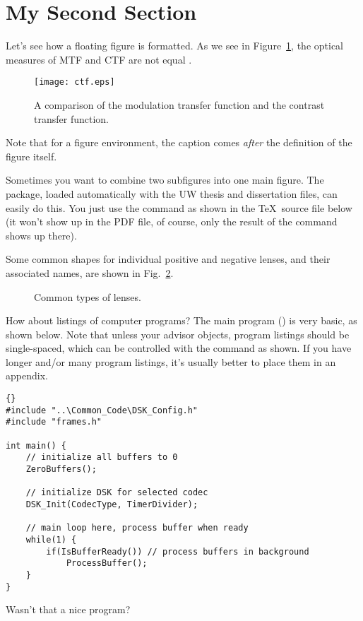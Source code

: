 \section{My Second Section}

Let's see how a floating figure is formatted.  As we see in
Figure~\ref{fg:ctf}, the optical measures of MTF and CTF are
not equal \cite{smith90}.
\begin{figure}
\centering
\texttt{[image: ctf.eps]}
\caption[MTF versus CTF.]{A comparison of the modulation transfer
function and the contrast transfer function.} \label{fg:ctf}%
\end{figure}
Note that for a figure environment, the caption comes \emph{after} the
definition of the figure itself.

Sometimes you want to combine two subfigures into one main figure.  The  package, loaded automatically with the UW thesis and dissertation files, can easily do this.  You just use the \pc{\subfloat} command as shown in the \TeX\ source file below (it won't show up in the PDF file, of course, only the result of the command shows up there).

Some common shapes for individual positive and negative lenses, and their associated names, are shown in Fig.~\ref{fg:lens_types}.  
\begin{figure}%
\centering
{}\qquad\qquad
{}
\caption{Common types of lenses.}
\label{fg:lens_types}
\end{figure}

How about listings of computer programs? The main program
() is very basic, as shown below. Note that unless your
advisor objects, program listings should be single-spaced, which
can be controlled with the \pc{\spacing} command as shown.  If you 
have longer and/or many program listings, it's usually better to 
place them in an appendix.

\begin{spacing}{1}
\begin{lstlisting}[caption={Main program for simple frame-based processing
  using ISRs.},label={cd:FrameMain_isr}]{}
#include "..\Common_Code\DSK_Config.h" 
#include "frames.h"

int main() {
    // initialize all buffers to 0
    ZeroBuffers();

    // initialize DSK for selected codec
    DSK_Init(CodecType, TimerDivider);

    // main loop here, process buffer when ready
    while(1) {
        if(IsBufferReady()) // process buffers in background
            ProcessBuffer();
    }
}
\end{lstlisting}
\end{spacing}
\noindent Wasn't that a nice program?  %

